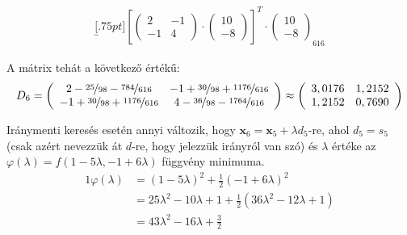 \begin{megoldas}
\begin{gather*}
{}{\underbracket[.75pt]{\left[\left(\begin{smallmatrix}2&-1\\-1&4\end{smallmatrix}\right)\cdot
\left(\begin{smallmatrix}10\\-8\end{smallmatrix}\right)\right]^T\cdot
\left(\begin{smallmatrix}10\\-8\end{smallmatrix}\right)}_{616}
}
\end{gather*}

A mátrix tehát a következő értékű:
\begin{gather*}
D_6=\left(\begin{array}{cc}2-\nicefrac{25}{98}-\nicefrac{784}{616}&-1+\nicefrac{30}{98}+\nicefrac{1176}{616}\\-1+\nicefrac{30}{98}+\nicefrac{1176}{616}&4-\nicefrac{36}{98}-\nicefrac{1764}{616}\end{array}\right)\approx\left(\begin{array}{cc}3,0176&1,2152\\1,2152&0,7690\end{array}\right)
\end{gather*}

Iránymenti keresés esetén annyi változik, hogy $\mathbf{x}_6=\mathbf{x}_5+\lambda d_5$-re, ahol $d_5=s_5$ (csak azért nevezzük át $d$-re, hogy jelezzük irányról van szó) és $\lambda$ értéke az $\varphi(\lambda)=f(1-5\lambda,-1+6\lambda)$ függvény minimuma.
\begin{alignat*}{1}
\varphi(\lambda)&=(1-5\lambda)^2+\tfrac{1}{2}(-1+6\lambda)^2\\
&=25\lambda^2-10\lambda+1+\tfrac{1}{2}(36\lambda^2-12\lambda+1)\\
&=43\lambda^2-16\lambda+\tfrac{3}{2}
\end{alignat*}
\end{megoldas}

